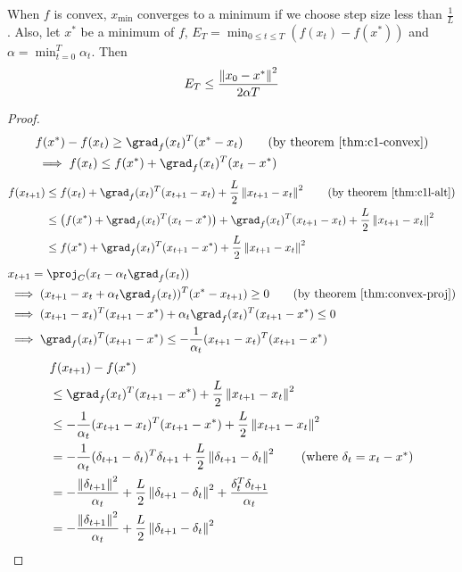 \begin{theorem}
When $f$ is convex, $x_{\textrm{min}}$ converges to a minimum
if we choose step size less than $\frac{1}{L}$.
Also, let $x^*$ be a minimum of $f$, $E_T = \min_{0 \le t \le T} (f(x_t) - f(x^*))$
and $\alpha = \min_{t=0}^T \alpha_t$. Then
\[ E_T \le \frac{\left\lVert x_0 - x^* \right\rVert^2}{2\alpha T} \]
\end{theorem}
\begin{proof}
\begin{align*}
& f(x^*) - f(x_t) \ge \grad_f(x_t)^T(x^* - x_t) \tag{by theorem \ref{thm:c1-convex}}
\\ &\implies f(x_t) \le f(x^*) + \grad_f(x_t)^T(x_t - x^*)
\end{align*}
\begin{align*}
f(x_{t+1}) &\le f(x_t) + \grad_f(x_t)^T(x_{t+1} - x_t) + \frac{L}{2}\norm{x_{t+1} - x_t}^2
\tag{by theorem \ref{thm:c1l-alt}}
\\ &\le \left(f(x^*) + \grad_f(x_t)^T(x_t - x^*)\right) + \grad_f(x_t)^T(x_{t+1} - x_t)
+ \frac{L}{2}\norm{x_{t+1} - x_t}^2
\\ &\le f(x^*) + \grad_f(x_t)^T(x_{t+1}-x^*) + \frac{L}{2}\norm{x_{t+1}-x_t}^2
\end{align*}
\begin{align*}
& x_{t+1} = \proj_C(x_t - \alpha_t\grad_f(x_t))
\\ &\implies (x_{t+1} - x_t + \alpha_t\grad_f(x_t))^T(x^* - x_{t+1}) \ge 0
\tag{by theorem \ref{thm:convex-proj}}
\\ &\implies (x_{t+1} - x_t)^T(x_{t+1} - x^*) + \alpha_t\grad_f(x_t)^T(x_{t+1} - x^*) \le 0
\\ &\implies \grad_f(x_t)^T(x_{t+1} - x^*) \le -\frac{1}{\alpha_t} (x_{t+1} - x_t)^T(x_{t+1} - x^*)
\end{align*}
\begin{align*}
& f(x_{t+1}) - f(x^*)
\\ &\le \grad_f(x_t)^T(x_{t+1}-x^*) + \frac{L}{2}\norm{x_{t+1}-x_t}^2
\\ &\le -\frac{1}{\alpha_t} (x_{t+1} - x_t)^T(x_{t+1} - x^*) + \frac{L}{2}\norm{x_{t+1}-x_t}^2
\\ &= -\frac{1}{\alpha_t} (\delta_{t+1}-\delta_t)^T\delta_{t+1} + \frac{L}{2}\norm{\delta_{t+1}-\delta_t}^2
\tag{where $\delta_t = x_t - x^*$}
\\ &= -\frac{\norm{\delta_{t+1}}^2}{\alpha_t} + \frac{L}{2}\norm{\delta_{t+1}-\delta_t}^2
+ \frac{\delta_t^T\delta_{t+1}}{\alpha_t}
\\ &= -\frac{\norm{\delta_{t+1}}^2}{\alpha_t} + \frac{L}{2}\norm{\delta_{t+1}-\delta_t}^2

\end{align*}
\end{proof}
